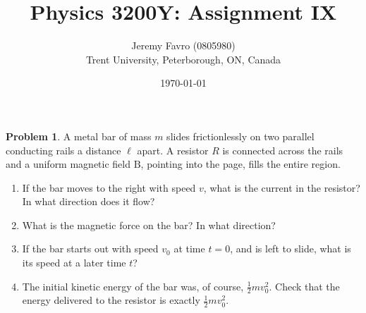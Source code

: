\documentclass[10pt]{article}
\title{Physics 3200Y: Assignment IX}
\author{Jeremy Favro (0805980) \\ Trent University, Peterborough, ON, Canada}
\date{\today}
\theoremstyle{definition}
\newtheorem{problem}{Problem}
\newcommand{\bv}[1]{\bm{\mathrm{#1}}}
\begin{document}
\maketitle

\begin{problem}
A metal bar of mass $m$ slides frictionlessly on two parallel conducting rails a distance $\ell$ apart.
A resistor $R$ is connected across the rails and a uniform magnetic field $\bv{B}$, pointing into the page,
fills the entire region.
\begin{enumerate}[label=(\alph*)]
  \item If the bar moves to the right with speed $v$, what is the current in the resistor? In what direction does it flow?
  \item What is the magnetic force on the bar? In what direction?
  \item If the bar starts out with speed $v_0$ at time $t=0$, and is left to slide, what is its speed at a later time $t$?
  \item The initial kinetic energy of the bar was, of course, $\frac{1}{2}mv_0^2$. Check that the energy delivered to the
        resistor is exactly $\frac{1}{2}mv_0^2$.
\end{enumerate}
\end{problem}
\end{document}
